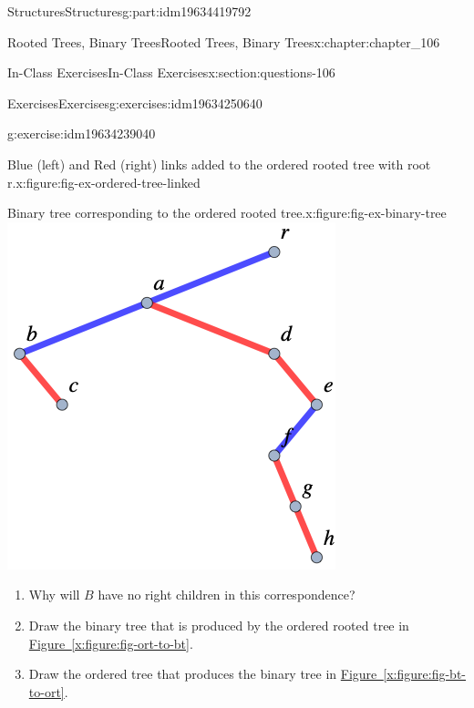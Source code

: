 \documentclass[oneside,10pt,]{book}
\newcommand{\xreffont}{\relax}
\numberwithin{equation}{section}
\begin{document}
\begin{partptx}{Structures}{}{Structures}{}{}{g:part:idm19634419792}
\begin{chapterptx}{Rooted Trees, Binary Trees}{}{Rooted Trees, Binary Trees}{}{}{x:chapter:chapter_106}
\begin{sectionptx}{In-Class Exercises}{}{In-Class Exercises}{}{}{x:section:questions-106}
\begin{exercises-subsection-numberless}{Exercises}{}{Exercises}{}{}{g:exercises:idm19634250640}
\begin{exercisegroup}
\begin{divisionexerciseeg}{5}{}{}{g:exercise:idm19634239040}
\begin{sidebyside}{2}{0}{0}{0}
\begin{sbspanel}{0.5}
\begin{figureptx}{Blue (left) and Red (right) links added to the ordered rooted tree with root r.}{x:figure:fig-ex-ordered-tree-linked}{}
\tcblower
\end{figureptx}%
\end{sbspanel}%
\begin{sbspanel}{0.5}%
\begin{figureptx}{Binary tree corresponding to the ordered rooted tree.}{x:figure:fig-ex-binary-tree}{}%
\includegraphics[width=\linewidth]{images/fig-ex-binary-tree.png}
\tcblower
\end{figureptx}%
\end{sbspanel}%
\end{sidebyside}%
\par
%
\begin{enumerate}[label=(\alph*)]
\item{}Why will \(B\) have no right children in this correspondence?%
\item{}Draw the binary tree that is produced by the ordered rooted tree in \hyperref[x:figure:fig-ort-to-bt]{Figure~{\xreffont\ref{x:figure:fig-ort-to-bt}}}.%
\item{}Draw the ordered tree that produces the binary tree in \hyperref[x:figure:fig-bt-to-ort]{Figure~{\xreffont\ref{x:figure:fig-bt-to-ort}}}.%

\end{enumerate}
\end{divisionexerciseeg}
\end{exercisegroup}
\end{exercises-subsection-numberless}
\end{sectionptx}
\end{chapterptx}
\end{partptx}
\end{document}
